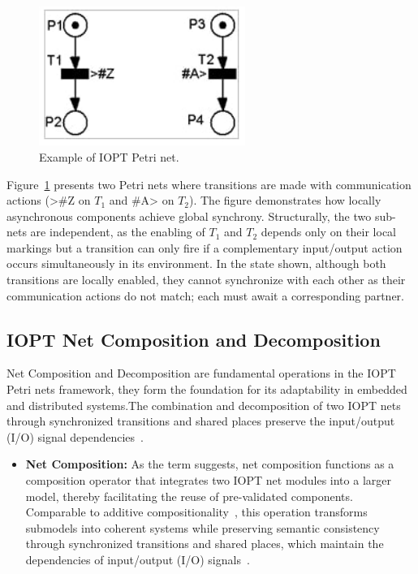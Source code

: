 \begin{figure}[htbp]
  \centering
  \includegraphics[width=0.6\textwidth]{Chapters/Figures/petrisplit.jpg}
  \caption{Example of IOPT Petri net.}
  \label{fig:petrisplit}
\end{figure}


Figure~\ref{fig:petrisplit} presents two Petri nets where transitions are made with communication actions (>\#Z on $T_1$ and \#A> on $T_2$). The figure demonstrates how locally asynchronous components achieve global synchrony. Structurally, the two sub-nets are independent, as the enabling of $T_1$ and $T_2$ depends only on their local markings but a transition can only fire if a complementary input/output action occurs simultaneously in its environment. In the state shown, although both transitions are locally enabled, they cannot synchronize with each other as their communication actions do not match; each must await a corresponding partner.



\subsection{IOPT Net Composition and Decomposition}
\label{sub:net_addicion}

Net Composition and Decomposition are fundamental operations in the IOPT Petri nets framework, they form the foundation for its adaptability in embedded and distributed systems.The combination and decomposition of two IOPT nets through synchronized transitions and shared places preserve the input/output (I/O) signal dependencies~\cite{add1}.

\begin{itemize}
    \item \textbf{Net Composition: }     
As the term suggests, net composition functions as a composition operator that integrates two IOPT net modules into a larger model, thereby facilitating the reuse of pre-validated components. Comparable to additive compositionality~\cite{add2}, this operation transforms submodels into coherent systems while preserving semantic consistency through synchronized transitions and shared places, which maintain the dependencies of input/output (I/O) signals~\cite{add1}.
\end{itemize}

